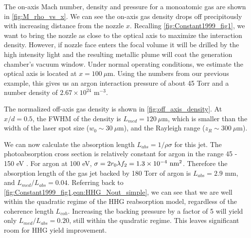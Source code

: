 The on-axis Mach number, density and pressure for a monoatomic gas are shown in \cref{fig:M_rho_vs_x}. We can see the on-axis gas density drops off precipitously with increasing distance from the nozzle $x$. Recalling \cref{fig:Constant1999_fig1}, we want to bring the nozzle as close to the optical axis to maximize the interaction density. However, if nozzle face enters the focal volume it will be drilled by the high intensity light and the resulting metallic plume will coat the generation chamber's vacuum window. Under normal operating conditions, we estimate the optical axis is located at $x=100 \ \mu$m. Using the numbers from our previous example, this gives us an argon interaction pressure of about 45 Torr and a number density of $2.67 \times 10^{24} \textrm{ m}^{-3}$.

The normalized off-axis gas density is shown in \cref{fig:off_axis_density}. At $x/d=0.5$, the FWHM of the density is $L_{med} = 120 \ \mu$m, which is smaller than the width of the laser spot size ($w_0 \sim 30 \ \mu$m), and the Rayleigh range ($z_R \sim 300 \ \mu$m).

We can now calculate the absorption length $L_{abs} = 1 / \rho \sigma$ for this jet. The photoabsorption cross section is relatively constant for argon in the range 45 - 150 eV \cite{gulliksonCXROXRayInteractions}. For argon at 100 eV, $\sigma = 2 r_0 \lambda f_2 = 1.3 \times 10^{-4} \textrm{ nm\textsuperscript{2}}$. Therefore the absorption length of the gas jet backed by 180 Torr of argon is $L_{abs} = 2.9 \textrm{ mm}$, and $L_{med}/L_{abs} = 0.04$. Referring back to \cref{fig:Constant1999_fig1,eqn:HHG_Nout_simple}, we can see that we are well within the quadratic regime of the HHG reabsorption model, regardless of the coherence length $L_{coh}$. Increasing the backing pressure by a factor of 5 will yield only $L_{med}/L_{abs} = 0.20$, still within the quadratic regime. This leaves significant room for HHG yield improvement.


